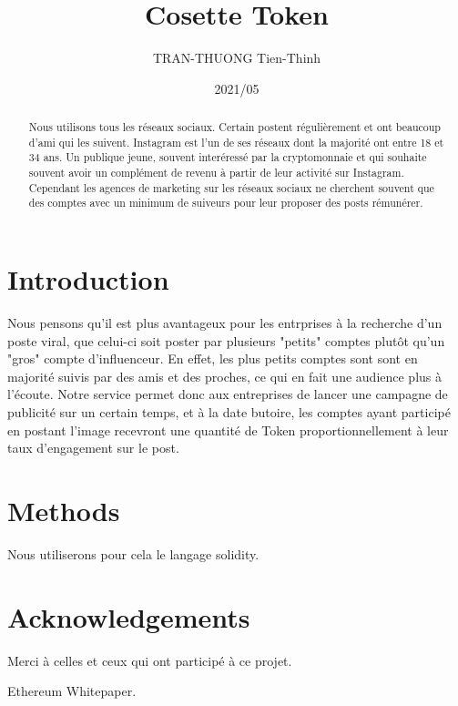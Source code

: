 \documentclass[10pt]{article}
\title{Cosette Token}
\author{TRAN-THUONG Tien-Thinh}
\date{2021/05}
\begin{document}
\maketitle

\begin{abstract}
Nous utilisons tous les réseaux sociaux. Certain postent régulièrement et ont beaucoup d'ami qui les suivent. Instagram est l'un de ses réseaux dont la majorité ont entre 18 et 34 ans. Un publique jeune, souvent interéressé par la cryptomonnaie et qui souhaite souvent avoir un complément de revenu à partir de leur activité sur Instagram. Cependant les agences de marketing sur les réseaux sociaux ne cherchent souvent que des comptes avec un minimum de suiveurs pour leur proposer des posts rémunérer.
\end{abstract}

\section{Introduction}
Nous pensons qu'il est plus avantageux pour les entrprises à la recherche d'un poste viral, que celui-ci soit poster par plusieurs "petits" comptes plutôt qu'un "gros" compte d'influenceur. En effet, les plus petits comptes sont sont en majorité suivis par des amis et des proches, ce qui en fait une audience plus à l'écoute. Notre service permet donc aux entreprises de lancer une campagne de publicité sur un certain temps, et à la date butoire, les comptes ayant participé en postant l'image recevront une quantité de Token proportionnellement à leur taux d'engagement sur le post.

\section{Methods}
Nous utiliserons pour cela le langage solidity.


\section*{Acknowledgements}
Merci à celles et ceux qui ont participé à ce projet.

\begin{thebibliography}{99}

Ethereum Whitepaper.

\end{thebibliography}

\end{document}
